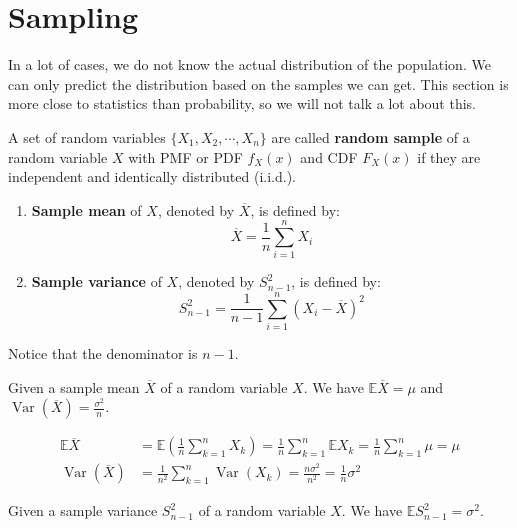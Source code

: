 \documentclass{huhtakm-template-book}
\newcommand{\expect}{\mathbb{E}}
\DeclareMathOperator{\Var}{Var}
\begin{document}
\section{Sampling}
In a lot of cases, we do not know the actual distribution of the population. We can only predict the distribution based on the samples we can get. This section is more close to statistics than probability, so we will not talk a lot about this.
\begin{defn}
	A set of random variables $\{X_{1},X_{2},\cdots,X_{n}\}$ are called \textbf{random sample} of a random variable $X$ with PMF or PDF $f_{X}(x)$ and CDF $F_{X}(x)$ if they are independent and identically distributed (i.i.d.).
	\begin{enumerate}
		\item \textbf{Sample mean} of $X$, denoted by $\overline{X}$, is defined by:
		\begin{equation*}
			\overline{X}=\frac{1}{n}\sum_{i=1}^{n}X_{i}
		\end{equation*}
		\item \textbf{Sample variance} of $X$, denoted by $S_{n-1}^{2}$, is defined by:
		\begin{equation*}
			S_{n-1}^{2}=\frac{1}{n-1}\sum_{i=1}^{n}(X_{i}-\overline{X})^{2}
		\end{equation*}
	\end{enumerate}
\end{defn}
\begin{rem}
	Notice that the denominator is $n-1$.
\end{rem}
\begin{thm}
	\label{Chapter 6 (Theorem) Expectation and variance of sample mean}
	Given a sample mean $\overline{X}$ of a random variable $X$. We have $\expect{\overline{X}}=\mu$ and $\Var(\overline{X})=\frac{\sigma^{2}}{n}$.
\end{thm}
\begin{proofing}
	\begin{align*}
		\expect{\overline{X}}&=\expect\left(\frac{1}{n}\sum_{k=1}^{n}X_{k}\right)=\frac{1}{n}\sum_{k=1}^{n}\expect{X_{k}}=\frac{1}{n}\sum_{k=1}^{n}\mu=\mu\\
		\Var(\overline{X})&=\frac{1}{n^{2}}\sum_{k=1}^{n}\Var(X_{k})=\frac{n\sigma^{2}}{n^{2}}=\frac{1}{n}\sigma^{2}
	\end{align*}
\end{proofing}
\begin{thm}
	Given a sample variance $S_{n-1}^{2}$ of a random variable $X$. We have $\expect{S_{n-1}^{2}}=\sigma^{2}$.
\end{thm}
\end{document}
